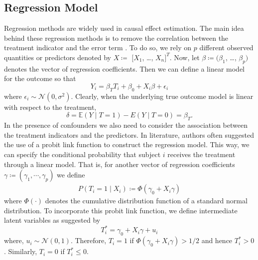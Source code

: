 \documentclass[oribibl]{llncs}
\begin{document}
\subsection{Regression Model}
Regression methods are widely used in causal effect estimation. The
main idea behind these regression methods is to remove the
correlation between the treatment indicator and the error term
\cite{winship99,HECKMAN1985}. To do so, we rely on $p$ different observed quantities
or predictors denoted by $X\coloneqq$ $[X_1$, \dots, $X_n]^T$. Now, let
$\beta \coloneqq (\beta_1$, \dots, $\beta_p)$ denotes the vector of regression
coefficients. Then we can define a linear model for the outcome
so that
\begin{equation}
	Y_i = \beta_{T} T_i + \beta_0 + X_i\beta + \epsilon_i
\end{equation}
where $\epsilon_i\sim \mathcal{N}(0, \sigma^2)$. Clearly, when
the underlying true outcome model is linear with respect to the treatment,
\begin{equation}
	\delta = \mathbb{E}(Y\mid T =1) - E(Y\mid T=0) = \beta_{T}.
\end{equation}
In the presence of confounders we also need to consider the
association between the treatment indicators and the predictors.
In literature, authors often suggested the use of a probit link function to 
construct the regression model. This way, we can
specify the conditional probability that subject $i$ receives the treatment through a linear model. 
That is, for another vector of regression coefficients 
$\gamma\coloneqq(\gamma_1, \cdots, \gamma_p)$ we define
\begin{align}
	P(T_i=1\mid X_i) \coloneqq \Phi(\gamma_0+X_i\gamma)
\end{align}
where $\Phi(\cdot)$ denotes the cumulative distribution function
of a standard normal distribution. To incorporate this probit
link function, we define intermediate latent variables as suggested
by \cite{albert93}
\begin{equation}
	T_i^* = \gamma_0 + X_i\gamma +u_i
\end{equation}
where, $u_i\sim\mathcal{N}(0,1)$. Therefore, $T_i=1$ if $\Phi(\gamma_0+X_i\gamma)
>1/2$ and hence $T_i^*>0$. Similarly, $T_i=0$ if $T_i^*\le0$. 
\end{document}
